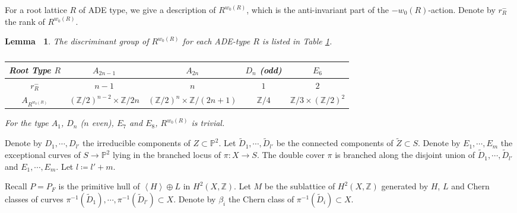 \documentclass[12pt,reqno,a4paper]{amsart}
\newtheorem{lem}[thm]{Lemma~}
\theoremstyle{remark}
\theoremstyle{definition}
\newcommand{\ZZ}{\mathbb{Z}}
\newcommand{\PP}{\mathbb{P}}
\newcommand{\calO}{\mathcal{O}}
\begin{document}
For a root lattice $R$ of ADE type, we give a description of $R^{w_0(R)}$, which is the anti-invariant part of the $-w_0(R)$-action.
Denote by $r_R^-$ the rank of $R^{w_0(R)}$.
\begin{lem}
\label{lem: anti-inv}
    The discriminant group of $R^{w_0(R)}$ for each ADE-type $R$ is listed in Table \ref{tab: r_R^-}.
\begin{table}[htbp]  %
  \centering  %
  \caption{}  %
  \begin{tabular}{ccccc}
  \toprule
  Root Type $R$ & $A_{2n-1}$ & $A_{2n}$ & $D_{n}$ (odd) & $E_6$  \\  %
  \midrule
  $r_R^-$ & $n-1$ & $n$ & $1$ & $2$ \\ %
  $A_{R^{w_0(R)}}$ & $(\ZZ/2)^{n-2}\times \ZZ/2n$ & $(\ZZ/2)^n\times \ZZ/(2n+1)$ & $\ZZ/4$ & $\ZZ/3\times(\ZZ/2)^2$ \\  %
  \bottomrule
  \end{tabular}
  \label{tab: r_R^-}  %
\end{table}
For the type $A_1$, $D_n$ ($n$ even), $E_7$ and $E_8$, $R^{w_0(R)}$ is trivial.
\end{lem}

Denote by $D_1,\cdots,D_{l'}$ the irreducible components of $Z\subset \PP^2$.
Let $\widetilde{D}_1,\cdots,\widetilde{D}_{l'}$ be the connected components of $\widetilde{Z}\subset S$.
Denote by $E_1,\cdots,E_{m}$ the exceptional curves of $S\to \PP^2$ lying in the branched locus of $\pi\colon X\to S$.
The double cover $\pi$ is branched along the disjoint union of $\widetilde{D}_1,\cdots,\widetilde{D}_{l'}$ and $E_1,\cdots,E_{m}$.
Let $l\coloneqq l'+m$.

Recall $P=P_F$ is the primitive hull of $\left\langle H\right\rangle \oplus L$ in $H^2(X,\ZZ)$.
Let $M$ be the sublattice of $H^2(X,\ZZ)$ generated by $H$, $L$ and Chern classes of curves $\pi^{-1}(\widetilde{D}_1),\cdots, \pi^{-1}(\widetilde{D}_{l'}) \subset X$.
Denote by $\beta_i$ the Chern class of $\pi^{-1}(\widetilde{D}_i)\subset X$. 


\end{document}
